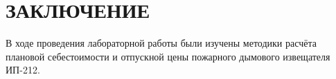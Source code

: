\section*{ЗАКЛЮЧЕНИЕ}

В ходе проведения лабораторной работы были изучены методики расчёта
плановой себестоимости и отпускной цены пожарного дымового извещателя ИП-212.

\newpage
